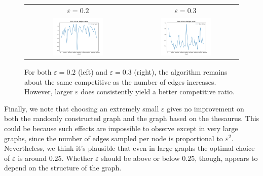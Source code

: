 \documentclass[
]{article}
\begin{document}
\begin{figure}[!htb]
    \begin{tabular}{cc}
      {\(\varepsilon  = 0.2\)} & {\(\varepsilon = 0.3\)}\\
      \includegraphics[width=0.5\textwidth]{images/error_ratio_as_edges_varies_eps_equals_0.2.png}
      &
      \includegraphics[width=0.5\textwidth]{images/error_ratio_as_edges_varies_eps_equals_0.3.png}\\
    \end{tabular}
    \caption{\label{fig:error-ratio-as-edges-varies}
    For both $\varepsilon = 0.2$ (left) and $\varepsilon = 0.3$ (right), the
    algorithm remains about the same competitive as the number of edges
    increases. However, larger $\varepsilon$ does consistently yield
    a better competitive ratio.}
\end{figure}

Finally, we note that choosing an extremely small $\varepsilon$ gives no improvement
on both the randomly constructed graph and the graph based on the thesaurus. This could be
because such effects are impossible to observe except in very large graphs, since the number
of edges sampled per node is proportional to $\varepsilon^2$. Nevertheless, we think it's
plausible that even in large graphs the optimal choice of $\varepsilon$ is around $0.25$.
Whether $\varepsilon$ should be above or below $0.25$, though, appears to depend on the
structure of the graph.
\end{document}
